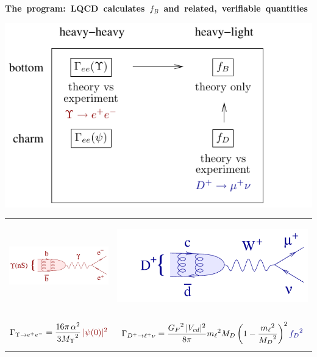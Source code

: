 \documentclass[landscape]{article}
\newenvironment{slide}[1][ ]{\mbox{\bf #1 } \vfill}{\vfill \mbox{ } \pagebreak}
\begin{document}
\begin{slide}[The program: LQCD calculates {\boldmath $f_B$} and related,
verifiable quantities]

\vfill

\vfill

\begin{center}
  \includegraphics[width=0.7\linewidth]{motivation_table}

  \begin{tabular}{p{0.35\linewidth} p{0.65\linewidth}}
    \begin{minipage}{\linewidth} \begin{center}
	\includegraphics[width=10 cm]{diagram_gamee}
    \end{center} \end{minipage} &
    \begin{minipage}{\linewidth} \begin{center}
	\includegraphics[width=10 cm]{diagram_dtomunu}
    \end{center} \end{minipage} \\
    \begin{minipage}{\linewidth} \[
      \Gamma_{\Upsilon \to e^+e^-} = \frac{16 \pi \, \alpha^2}{3 {M_\Upsilon}^2} \, {\color{dkred} |\psi(0)|^2}
    \] \end{minipage} &
    \begin{minipage}{\linewidth} \[
      \Gamma_{D^+ \to \ell^+\nu} = \frac{{G_F}^2 \, |V_{cd}|^2}{8\pi} {m_\ell}^2 M_D \left(1 - \frac{{m_\ell}^2}{{M_D}^2} \right)^2 {\color{dkblue} {f_D}^2}
    \] \end{minipage}
  \end{tabular}
\end{center}

\end{slide}
\end{document}

